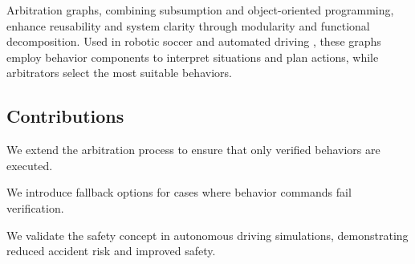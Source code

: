 Arbitration graphs, combining subsumption and object-oriented programming, enhance reusability and system clarity through modularity and functional decomposition. Used in robotic soccer \cite{lauerCognitiveConceptsAutonomous2010} and automated driving \cite{orzechowskiDecisionMakingAutomatedVehicles2020a}, these graphs employ behavior components to interpret situations and plan actions, while arbitrators select the most suitable behaviors.

\subsection{Contributions}

\begin{description}[align=left]
    \item[Verification Logic] We extend the arbitration process to ensure that only verified behaviors are executed.
    \item[Fallback Logic] We introduce fallback options for cases where behavior commands fail verification.
    \item[Application] We validate the safety concept in autonomous driving simulations, demonstrating reduced accident risk and improved safety.
\end{description}
